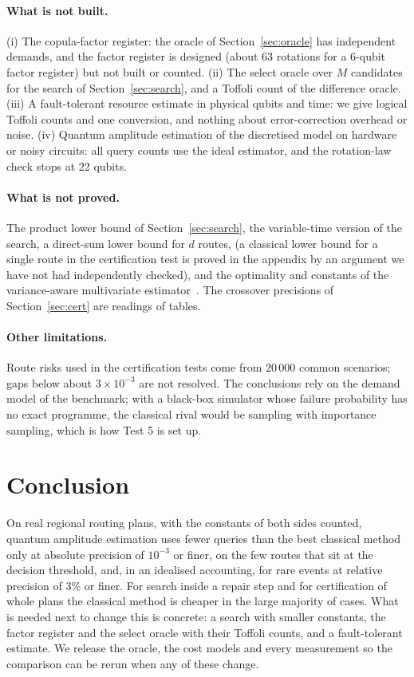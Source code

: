 \documentclass[pdflatex,sn-mathphys-num]{sn-jnl}
\theoremstyle{thmstyleone}
\theoremstyle{thmstyletwo}
\begin{document}
\paragraph{What is not built.} (i) The copula-factor register: the oracle of Section~\ref{sec:oracle} has independent demands, and the factor register is designed (about $63$ rotations for a $6$-qubit factor register) but not built or counted. (ii) The select oracle over $M$ candidates for the search of Section~\ref{sec:search}, and a Toffoli count of the difference oracle. (iii) A fault-tolerant resource estimate in physical qubits and time: we give logical Toffoli counts and one conversion, and nothing about error-correction overhead or noise. (iv) Quantum amplitude estimation of the discretised model on hardware or noisy circuits: all query counts use the ideal estimator, and the rotation-law check stops at 22 qubits.

\paragraph{What is not proved.} The product lower bound of Section~\ref{sec:search}, the variable-time version of the search, a direct-sum lower bound for $d$ routes, (a classical lower bound for a single route in the certification test is proved in the appendix by an argument we have not had independently checked), and the optimality and constants of the variance-aware multivariate estimator~\cite{Tang2025}. The crossover precisions of Section~\ref{sec:cert} are readings of tables.

\paragraph{Other limitations.} Route risks used in the certification tests come from $20\,000$ common scenarios; gaps below about $3\times10^{-3}$ are not resolved. The conclusions rely on the demand model of the benchmark; with a black-box simulator whose failure probability has no exact programme, the classical rival would be sampling with importance sampling, which is how Test 5 is set up.

\section{Conclusion}\label{sec:conclusion}
On real regional routing plans, with the constants of both sides counted, quantum amplitude estimation uses fewer queries than the best classical method only at absolute precision of $10^{-3}$ or finer, on the few routes that sit at the decision threshold, and, in an idealised accounting, for rare events at relative precision of $3\%$ or finer. For search inside a repair step and for certification of whole plans the classical method is cheaper in the large majority of cases. What is needed next to change this is concrete: a search with smaller constants, the factor register and the select oracle with their Toffoli counts, and a fault-tolerant estimate. We release the oracle, the cost models and every measurement so the comparison can be rerun when any of these change.
\end{document}
